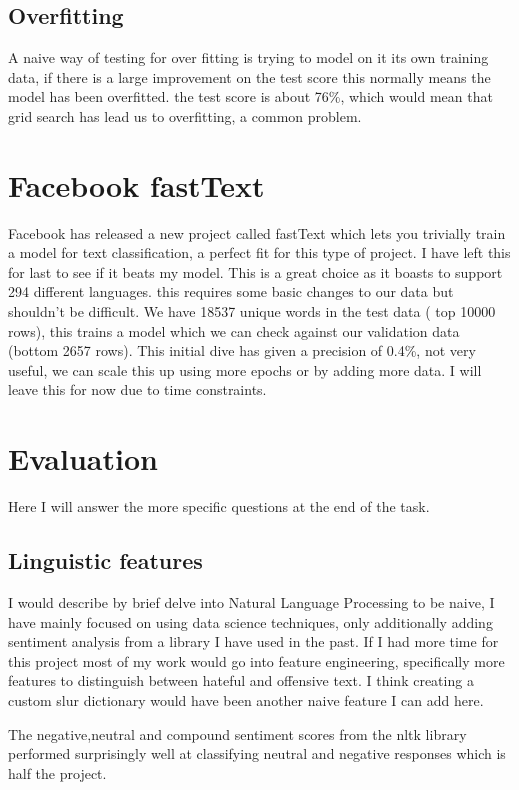 \documentclass[a4paper]{article}
\begin{document}
\subsection{Overfitting}
A naive way of testing for over fitting is trying to model on it its own training data, if there is a large improvement on the test score this normally means the model has been overfitted. the test score is about 76\%, which would mean that grid search has lead us to overfitting, a common problem.


\section{Facebook fastText}
Facebook has released a new project called fastText which lets you trivially train a model for text classification, a perfect fit for this type of project. I have left this for last to see if it beats my model. This is a great choice as it boasts to support 294 different languages. this requires some basic changes to our data but shouldn't be difficult. We have 18537 unique words in the test data ( top 10000 rows), this trains a model which we can check against our validation data (bottom 2657 rows). This initial dive has given a precision of 0.4\%, not very useful, we can scale this up using more epochs or by adding more data. I will leave this for now due to time constraints.

\section{Evaluation}
Here I will answer the more specific questions at the end of the task.
\subsection{Linguistic features}
I would describe by brief delve into Natural Language Processing to be naive, I have mainly focused on using data science techniques, only additionally adding sentiment analysis from a library I have used in the past. If I had more time for this project most of my work would go into feature engineering, specifically more features to distinguish between hateful and offensive text. I think creating a custom slur dictionary would have been another naive feature I can add here.

The negative,neutral and compound sentiment scores from the nltk library performed surprisingly well at classifying neutral and negative responses which is half the project.
\end{document}
